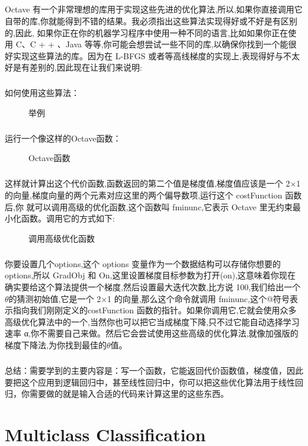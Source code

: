 \documentclass{article}
\begin{document}
\begin{CJK}{UTF8}{gbsn}
\subparagraph{}
Octave 有一个非常理想的库用于实现这些先进的优化算法,所以,如果你直接调用它
自带的库,你就能得到不错的结果。我必须指出这些算法实现得好或不好是有区别的,因此,
如果你正在你的机器学习程序中使用一种不同的语言,比如如果你正在使用 C、C + + 、Java
等等,你可能会想尝试一些不同的库,以确保你找到一个能很好实现这些算法的库。因为在
L-BFGS 或者等高线梯度的实现上,表现得好与不太好是有差别的,因此现在让我们来说明:
\subparagraph{}
如何使用这些算法：
\begin{figure}[H]
\caption{举例}
\label{fig:330}
\end{figure}
\subparagraph{}
运行一个像这样的Octave函数：
\begin{figure}[H]
\caption{Octave函数}
\label{fig:331}
\end{figure}
\subparagraph{}
这样就计算出这个代价函数,函数返回的第二个值是梯度值,梯度值应该是一个 2×1的向量,梯度向量的两个元素对应这里的两个偏导数项,运行这个 costFunction 函数后,你
就可以调用高级的优化函数,这个函数叫 fminunc,它表示 Octave 里无约束最小化函数。调用它的方式如下:
\begin{figure}[H]
\caption{调用高级优化函数}
\label{fig:332}
\end{figure}
\subparagraph{}
你要设置几个options,这个 options 变量作为一个数据结构可以存储你想要的 options,所以 GradObj 和 On,这里设置梯度目标参数为打开(on),这意味着你现在确实要给这个算法提供一个梯度,然后设置最大迭代次数,比方说 100,我们给出一个$\theta$的猜测初始值,它是一个 2×1 的向量,那么这个命令就调用 fminunc,这个@符号表示指向我们刚刚定义的costFunction 函数的指针。如果你调用它,它就会使用众多高级优化算法中的一个,当然你也可以把它当成梯度下降,只不过它能自动选择学习速率 α,你不需要自己来做。然后它会尝试使用这些高级的优化算法,就像加强版的梯度下降法,为你找到最佳的$\theta$值。
\subparagraph{}
总结：需要学到的主要内容是：写一个函数，它能返回代价函数值，梯度值，因此要把这个应用到逻辑回归中，甚至线性回归中，你可以把这些优化算法用于线性回归，你需要做的就是输入合适的代码来计算这里的这些东西。
\section{Multiclass Classification}

\end{CJK}
\end{document}
